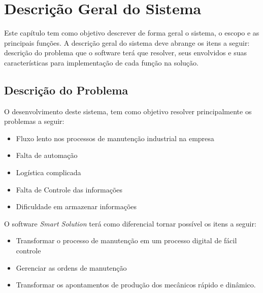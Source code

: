 \chapter{Descrição Geral do Sistema }

Este capítulo tem como objetivo descrever de forma geral o sistema, o escopo e as principais funções. A descrição geral do sistema deve abrange os itens a seguir: descrição do problema que o software terá que resolver, seus envolvidos e suas características para implementação de cada função na solução.

\section{Descrição do Problema}
O desenvolvimento deste sistema, tem como objetivo resolver principalmente os problemas a seguir:

\begin{itemize}
	\item Fluxo lento nos processos de manutenção industrial na empresa
	\item Falta de automação
	\item Logística complicada
	\item Falta de Controle das informações
	\item Dificuldade em armazenar informações

\end{itemize}


O software \textit{Smart Solution} terá como diferencial tornar possível os itens a seguir:

\begin{itemize}

	\item Transformar o processo de manutenção em um processo digital de fácil controle
	\item Gerenciar as ordens de manutenção
	\item Transformar os apontamentos de produção dos mecânicos rápido e dinâmico.
		
\end{itemize}

